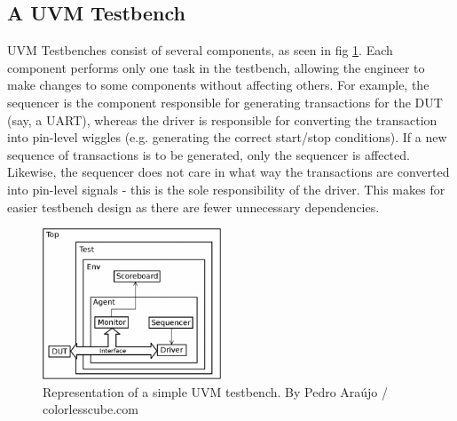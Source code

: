 \documentclass[a4paper, conference]{IEEEtran}
\begin{document}
\subsection{A UVM Testbench}
UVM Testbenches consist of several components, as seen in fig \ref{fig:uvm_testbench}. Each component performs only one task in the testbench, allowing the engineer to make changes to some components without affecting others. 
For example, the sequencer is the component responsible for generating transactions for the DUT (say, a UART), whereas the driver is responsible for converting the transaction into pin-level wiggles (e.g. generating the correct start/stop conditions). If a new sequence of transactions is to be generated, only the sequencer is affected. Likewise, the sequencer does not care in what way the transactions are converted into pin-level signals - this is the sole responsibility of the driver. This makes for easier testbench design as there are fewer unnecessary dependencies. 

\begin{figure}
    \centering
    \includegraphics[width=0.475\textwidth]{uvm-tb_Pedro-Araujo.png}
    \caption{Representation of a simple UVM testbench. By Pedro Araújo / colorlesscube.com}
    \label{fig:uvm_testbench}
\end{figure}
\end{document}
